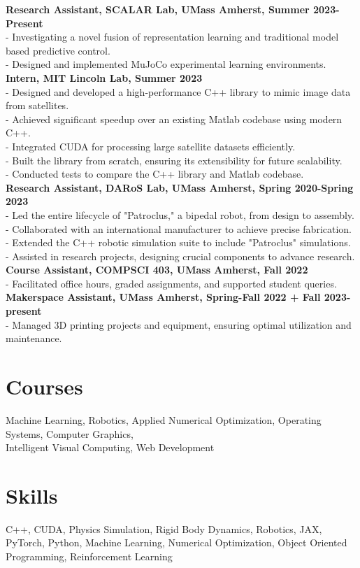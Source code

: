 \documentclass[letterpaper, 10pt]{article}
\begin{document}
\noindent
\textbf{Research Assistant, SCALAR Lab, UMass Amherst, Summer 2023-Present} \\
- Investigating a novel fusion of representation learning and traditional model based predictive control. \\
- Designed and implemented MuJoCo experimental learning environments. \\

\noindent
\textbf{Intern, MIT Lincoln Lab, Summer 2023} \\
- Designed and developed a high-performance C++ library to mimic image data from satellites. \\
- Achieved significant speedup over an existing Matlab codebase using modern C++. \\
- Integrated CUDA for processing large satellite datasets efficiently. \\
- Built the library from scratch, ensuring its extensibility for future scalability. \\
- Conducted tests to compare the C++ library and Matlab codebase.\\

\noindent
\textbf{Research Assistant, DARoS Lab, UMass Amherst, Spring 2020-Spring 2023} \\
- Led the entire lifecycle of "Patroclus," a bipedal robot, from design to assembly. \\
- Collaborated with an international manufacturer to achieve precise fabrication. \\
- Extended the C++ robotic simulation suite to include "Patroclus" simulations. \\
- Assisted in research projects, designing crucial components to advance research.\\

\noindent
\textbf{Course Assistant, COMPSCI 403, UMass Amherst, Fall 2022} \\
- Facilitated office hours, graded assignments, and supported student queries.\\

\noindent
\textbf{Makerspace Assistant, UMass Amherst, Spring-Fall 2022 + Fall 2023-present} \\
- Managed 3D printing projects and equipment, ensuring optimal utilization and maintenance.

\section*{Courses}
Machine Learning, Robotics, Applied Numerical Optimization, Operating Systems, Computer Graphics,\\ Intelligent Visual Computing, Web Development

\section*{Skills}
C++, CUDA, Physics Simulation, Rigid Body Dynamics, Robotics, JAX, PyTorch, Python, Machine Learning, Numerical Optimization, Object Oriented Programming, Reinforcement Learning
\end{document}
